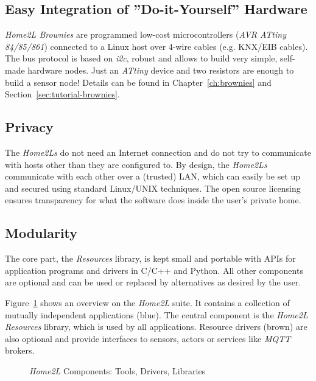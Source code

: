 \documentclass[12pt,english,parskip=half,headheight=19pt]{scrreprt}
\newcommand{\figsvg}[2][]{}            %
\newcommand{\figsvg}[2][]{\href{#2}{}} %
\begin{document}
\subsection*{Easy Integration of ''Do-it-Yourself'' Hardware}

\textit{Home2L Brownies} are programmed low-cost microcontrollers (\textit{AVR ATtiny 84/85/861}) connected to a Linux host over 4-wire cables (e.g. KNX/EIB cables). The bus protocol is based on \textit{i2c}, robust and allows to build very simple, self-made hardware nodes. Just an \textit{ATtiny} device and two resistors are enough to build a sensor node! Details can be found in Chapter~\ref{ch:brownies} and Section~\ref{sec:tutorial-brownies}.


\subsection*{Privacy}

The \textit{Home2Ls} do not need an Internet connection and do not try to communicate with hosts other than they are configured to. By design, the \textit{Home2Ls} communicate with each other over a (trusted) LAN, which can easily be set up and secured using standard Linux/UNIX techniques. The open source licensing ensures transparency for what the software does inside the user's private home.


\subsection*{Modularity}

The core part, the \textit{Resources} library, is kept small and portable with APIs for application programs and drivers in C/C++ and Python. All other components are optional and can be used or replaced by alternatives as desired by the user.

Figure~\ref{fig:home2l-components} shows an overview on the \textit{Home2L} suite. It contains a collection of mutually independent applications (blue). The central component is the \textit{Home2L Resources} library, which is used by all applications. Resource drivers (brown) are also optional and provide interfaces to sensors, actors or services like \textit{MQTT} brokers.

\begin{figure}[ht]
  \centering
  \figsvg[width=0.9\linewidth]{figs/home2l-components.svg}
  \caption[l]{\textit{Home2L} Components:
    \textcolor[rgb]{0.2,0.3,1.0}{Tools},
    \textcolor[rgb]{0.5,0.25,0}{Drivers},
    \textcolor[rgb]{0,0.5,0}{Libraries}
  }
  \label{fig:home2l-components}
\end{figure}
\end{document}
